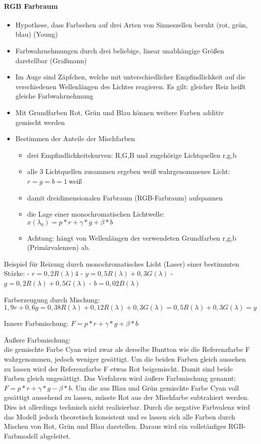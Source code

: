 \documentclass[10pt,landscape]{article}
\begin{document}
\begin{multicols}{3}
  \paragraph{RGB Farbraum}
  \begin{itemize}
    \item Hypothese, dass Farbsehen auf drei Arten von Sinneszellen beruht (rot, grün, blau) (Young)
    \item Farbwahrnehmungen durch drei beliebige, linear unabhängige Größen darstellbar (Graßmann)
    \item Im Auge sind Zäpfchen, welche mit unterschiedlicher Empfindlichkeit auf die verschiedenen Wellenlängen des Lichtes reagieren. Es gilt: gleicher Reiz heißt gleiche Farbwahrnehmung
    \item Mit Grundfarben Rot, Grün und Blau können weitere Farben additiv gemischt werden
    \item Bestimmen der Anteile der Mischfarben
          \begin{itemize}
            \item drei Empfindlichkeitskurven: R,G,B und zugehörige Lichtquellen r,g,b
            \item alle 3 Lichtquellen zusammen ergeben weiß wahrgenommenes Licht: $r=g=b=1~$weiß
            \item damit dreidimensionalen Farbraum (RGB-Farbraum) aufspannen
            \item die Lage einer monochromatischen Lichtwelle: $x(\lambda_0)=p*r+\gamma*g+\beta*b$
            \item Achtung: hängt von Wellenlängen der verwendeten Grundfarben r,g,b (Primärvalenzen) ab.
          \end{itemize}
  \end{itemize}
  
  Beispiel für Reizung durch monochromatisches Licht (Laser) einer bestimmten Stärke:
  - $r=0,2R(\lambda)4$
  - $y=0,5R(\lambda)+0,3G(\lambda)$
  - $g=0,2R(\lambda)+0,5G(\lambda)$
  - $b=0,02B(\lambda)$
  
  Farberzeugung durch Mischung:
  $$1,9r + 0,6g = 0,38R(\lambda)+0,12R(\lambda)+0,3G(\lambda)=0,5R(\lambda)+0,3G(\lambda) = y$$
  
  
  Innere Farbmischung: $F=p*r + \gamma*g + \beta*b$
  
  Äußere Farbmischung:\\
  die gemischte Farbe Cyan wird zwar als derselbe Buntton wie die Referenzfarbe F wahrgenommen, jedoch weniger gesättigt. Um die beiden Farben gleich aussehen zu lassen wird der Referenzfarbe F etwas Rot beigemischt. Damit sind beide Farben gleich ungesättigt. Das Verfahren wird äußere Farbmischung genannt: $F=p*r + \gamma *g - \beta *b$.
  Um die aus Blau und Grün gemischte Farbe Cyan voll gesättigt aussehend zu lassen, müsste Rot aus der Mischfarbe subtrahiert werden. Dies ist allerdings technisch nicht realisierbar. Durch die negative Farbvalenz wird das Modell jedoch theoretisch konsistent und es lassen sich alle Farben durch Mischen von Rot, Grün und Blau darstellen. Daraus wird ein vollstänfiges RGB-Farbmodell abgeleitet.
  

\end{multicols}
\end{document}
